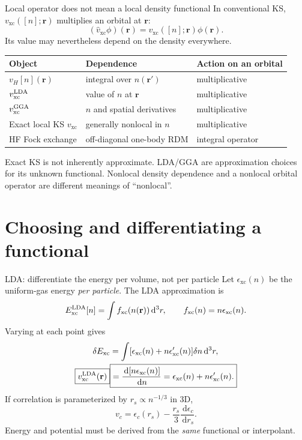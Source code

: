 \documentclass[aspectratio=169,10pt]{beamer}
\newcommand{\warnbox}[1]{\begin{tcolorbox}[colback=palewarm,colframe=warm,title={A trap to avoid}]#1\end{tcolorbox}}
\newcommand{\dd}{\,\mathrm d}
\newcommand{\rr}{\mathbf r}
\newcommand{\xc}{\mathrm{xc}}
\begin{document}
\begin{frame}{Local operator does not mean a local density functional}
In conventional KS, $v_{\xc}([n];\rr)$ multiplies an orbital at $\rr$:
\[
 (\hat v_{\xc}\phi)(\rr)=v_{\xc}([n];\rr)\phi(\rr).
\]
Its value may nevertheless depend on the density everywhere.
\begin{center}\small
\begin{tabular}{@{}lll@{}}
\toprule
Object & Dependence & Action on an orbital\\\midrule
$v_H[n](\rr)$ & integral over $n(\rr')$ & multiplicative\\
$v_{\xc}^{\rm LDA}$ & value of $n$ at $\rr$ & multiplicative\\
$v_{\xc}^{\rm GGA}$ & $n$ and spatial derivatives & multiplicative\\
Exact local KS $v_{\xc}$ & generally nonlocal in $n$ & multiplicative\\
HF Fock exchange & off-diagonal one-body RDM & integral operator\\\bottomrule
\end{tabular}
\end{center}
\warnbox{Exact KS is not inherently approximate. LDA/GGA are approximation
choices for its unknown functional. Nonlocal density dependence and a
nonlocal orbital operator are different meanings of ``nonlocal''.}
\end{frame}

\section[Functionals]{Choosing and differentiating a functional}
\begin{frame}{LDA: differentiate the energy per volume, not per particle}
Let $\epsilon_{\xc}(n)$ be the uniform-gas energy \emph{per particle}.
The LDA approximation is
\[
 E_{\xc}^{\rm LDA}[n]=\int f_{\xc}(n(\rr))\dd^3r,
 \qquad f_{\xc}(n)=n\epsilon_{\xc}(n).
\]
Varying at each point gives
\begin{align*}
 \delta E_{\xc}&=\int[\epsilon_{\xc}(n)+n\epsilon_{\xc}'(n)]\delta n\dd^3r,\\
 \boxed{v_{\xc}^{\rm LDA}(\rr)}
   &\boxed{=\frac{\dd[n\epsilon_{\xc}(n)]}{\dd n}
          =\epsilon_{\xc}(n)+n\epsilon_{\xc}'(n).}
\end{align*}
If correlation is parameterized by $r_s\propto n^{-1/3}$ in 3D,
\[
 v_c=\epsilon_c(r_s)-\frac{r_s}{3}\frac{\dd\epsilon_c}{\dd r_s}.
\]
Energy and potential must be derived from the \emph{same} functional or interpolant.
\end{frame}
\end{document}
